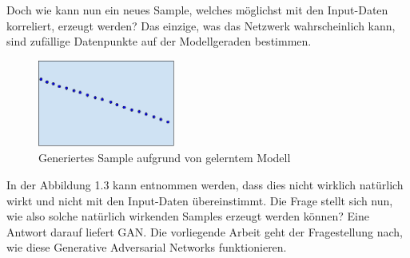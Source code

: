 Doch wie kann nun ein neues Sample, welches möglichst mit den Input-Daten korreliert, erzeugt werden? Das einzige, was
das Netzwerk wahrscheinlich kann, sind zufällige Datenpunkte auf der Modellgeraden bestimmen.
\begin{figure}[h!]
    \begin{center}
        \includegraphics[width=0.4\textwidth]{../common/02_main/resources/02_generierte_punkte.png}
    \end{center}
    \caption{Generiertes Sample aufgrund von gelerntem Modell}
    \label{fig:Generiertes Sample aufgrund von gelerntem Modell}
\end{figure}
In der Abbildung 1.3 kann entnommen werden, dass dies nicht wirklich natürlich wirkt und nicht mit den Input-Daten übereinstimmt.
Die Frage stellt sich nun, wie also solche natürlich wirkenden Samples erzeugt werden können? Eine Antwort darauf liefert
\Gls{GAN}. Die vorliegende Arbeit geht der Fragestellung nach, wie diese \glqq Generative Adversarial Networks\grqq{}
funktionieren.